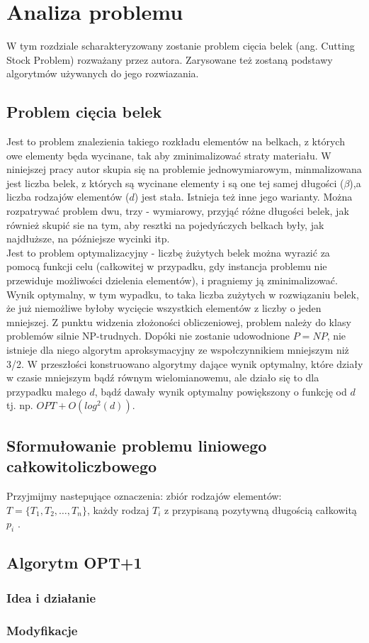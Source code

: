 \chapter{Analiza problemu}
\thispagestyle{chapterBeginStyle}

W tym rozdziale scharakteryzowany zostanie problem cięcia belek (ang. Cutting Stock Problem) rozważany przez autora. 
Zarysowane też zostaną podstawy algorytmów używanych do jego rozwiazania.

\section{Problem cięcia belek}
Jest to problem znalezienia takiego rozkładu elementów na belkach, z których owe elementy będa wycinane, tak aby zminimalizować straty materiału.  W niniejszej pracy autor skupia się na problemie jednowymiarowym, minmalizowana jest liczba belek, z których są wycinane elementy i są one tej samej długości ($\beta$),a liczba rodzajów elementów ($d$) jest stała. Istnieja też inne jego warianty. Można rozpatrywać problem dwu, trzy - wymiarowy, przyjąć różne długości belek, jak również skupić sie na tym, aby resztki na pojedyńczych belkach były, jak najdłuższe, na późniejsze wycinki itp. \\
Jest to problem optymalizacyjny - liczbę żużytych belek można wyrazić za pomocą funkcji celu (całkowitej w przypadku, gdy instancja problemu nie przewiduje możliwości dzielenia elementów), i pragniemy ją zminimalizować.
Wynik optymalny, w tym wypadku, to taka liczba zużytych w rozwiązaniu belek, że już niemożliwe byłoby wycięcie wszystkich elementów z liczby o jeden mniejszej.
Z punktu widzenia złożoności obliczeniowej, problem należy do klasy problemów silnie NP-trudnych. Dopóki nie zostanie udowodnione $P=NP$, nie istnieje dla niego algorytm aproksymacyjny ze wspołczynnikiem mniejszym niż 3/2. W przeszłości konstruowano algorytmy dające wynik optymalny, które działy w czasie mniejszym bądź równym wielomianowemu, ale działo się to dla przypadku małego $d$, bądź dawały wynik optymalny powiększony o funkcję od $d$ tj. np. $OPT + O(log^2(d))$.\cite{ALG_OPT_1}

\section{Sformułowanie problemu liniowego całkowitoliczbowego}
Przyjmijmy nastepujące oznaczenia: zbiór rodzajów elementów: $T = \{T_1, T_2, \dots, T_n\}$, każdy rodzaj $T_i$ z przypisaną pozytywną długością całkowitą $p_i$ .




\section{Algorytm OPT+1}
\subsection{Idea i działanie}
\subsection{Modyfikacje}

